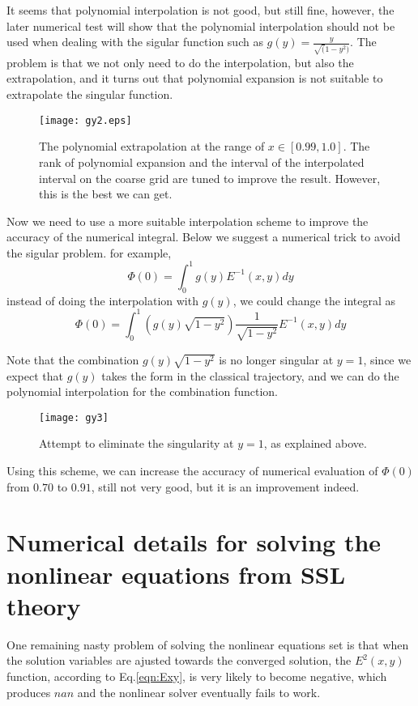 \documentclass{article}
\begin{document}
It seems that polynomial interpolation is not good, but still fine, however, the later numerical test will 
show that the polynomial interpolation should not be used when dealing with the sigular function such as 
$g(y)=\frac{y}{\sqrt(1-y^2)}$. The problem is that we not only need to do the interpolation, but also the extrapolation,
and it turns out that polynomial expansion is not suitable to extrapolate the singular function.

\begin{figure}[h]
\texttt{[image: gy2.eps]}
\caption{The polynomial extrapolation at the range of $x\in[0.99,1.0]$. The rank of polynomial
expansion and the interval of the interpolated interval on the coarse grid are tuned to improve the
result. However, this is the best we can get.}
\end{figure}


Now we need to use a more suitable interpolation scheme to improve the accuracy of the numerical integral.
Below we suggest a numerical trick to avoid the sigular problem. for example,
\begin{equation}
 \Phi(0)=\int^{1}_{0}g(y)E^{-1}(x,y)dy
\end{equation}
instead of doing the interpolation with $g(y)$, we could change the integral as
\begin{equation}
 \Phi(0)=\int^{1}_{0}(g(y)\sqrt{1-y^2})\frac{1}{\sqrt{1-y^2}}E^{-1}(x,y)dy
\end{equation}

Note that the combination $g(y)\sqrt{1-y^2}$ is no longer singular at $y=1$, since we expect that $g(y)$ takes the form in the classical
trajectory, and we can do the polynomial interpolation for the combination function.
\begin{figure}[h]
\texttt{[image: gy3]}
\caption{Attempt to eliminate the singularity at $y=1$, as explained above.}
\end{figure}

Using this scheme, we can increase the accuracy of numerical evaluation of $\Phi(0)$ from $0.70$ to $0.91$,
still not very good, but it is an improvement indeed.

\section{ Numerical details for solving the nonlinear equations from SSL theory}
One remaining nasty problem of solving the nonlinear equations set is that when the solution variables are
ajusted towards the converged solution, the $E^2(x,y)$ function, according to Eq.\ref{eqn:Exy}, is very likely to
become negative, which produces $nan$ and the nonlinear solver eventually fails to work.
\end{document}
